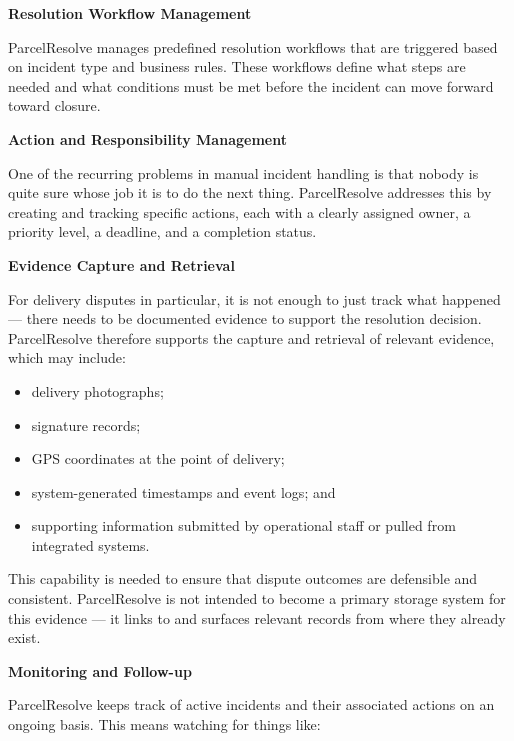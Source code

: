 \documentclass[11pt,a4paper]{article}
\begin{document}
\textbf{Resolution Workflow Management}

ParcelResolve manages predefined resolution workflows that are
triggered based on incident type and business rules. These workflows
define what steps are needed and what conditions must be met before
the incident can move forward toward closure.


\textbf{Action and Responsibility Management}

One of the recurring problems in manual incident handling is that
nobody is quite sure whose job it is to do the next thing. ParcelResolve
addresses this by creating and tracking specific actions, each with
a clearly assigned owner, a priority level, a deadline, and a
completion status.


\textbf{Evidence Capture and Retrieval}

For delivery disputes in particular, it is not enough to just track
what happened --- there needs to be documented evidence to support
the resolution decision. ParcelResolve therefore supports the capture
and retrieval of relevant evidence, which may include:

\begin{itemize}
    \item delivery photographs;
    \item signature records;
    \item GPS coordinates at the point of delivery;
    \item system-generated timestamps and event logs; and
    \item supporting information submitted by operational staff or
    pulled from integrated systems.
\end{itemize}

This capability is needed to ensure that dispute outcomes are
defensible and consistent. ParcelResolve is not intended to become
a primary storage system for this evidence --- it links to and
surfaces relevant records from where they already exist.


\textbf{Monitoring and Follow-up}

ParcelResolve keeps track of active incidents and their associated
actions on an ongoing basis. This means watching for things like:
\end{document}
